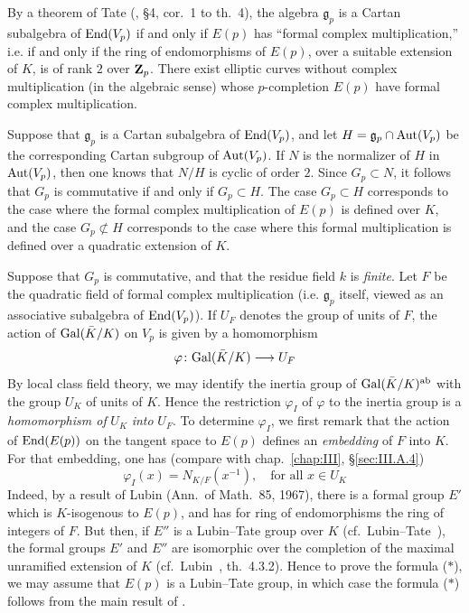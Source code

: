 \begin{remarks}
\begin{nlist}
\item By a theorem of Tate (\cite{tate-pdiv}, \S4, cor.~1 to th.~4), the
algebra $\mathfrak{g}_p$ is a Cartan subalgebra of $\mathrm{End}(V_p)$ if and
only if $E(p)$ has ``formal complex multiplication,'' i.e. if and only
if the ring of endomorphisms of $E(p)$, over a suitable extension of
$K$, is of rank $2$ over $\mathbf{Z}_p$. There exist elliptic curves without
complex multiplication (in the algebraic sense) whose $p$-completion
$E(p)$ have formal complex multiplication.
\item Suppose that $\mathfrak{g}_p$ is a Cartan subalgebra of
$\mathrm{End}(V_p)$, and let $H=\mathfrak{g}_p\cap\mathrm{Aut}(V_p)$ be the
corresponding Cartan subgroup of $\mathrm{Aut}(V_p)$. If $N$ is the normalizer
of $H$ in $\mathrm{Aut}(V_p)$, then one knows that $N/H$ is cyclic of order
$2$. Since $G_p\subset N$, it follows that $G_p$ is commutative if and
only if $G_p\subset H$. The case $G_p\subset H$ corresponds to the case
where the formal complex multiplication of $E(p)$ is defined over $K$,
and the case $G_p\not\subset H$ corresponds to the case where this
formal multiplication is defined over a quadratic extension of $K$.
\item Suppose that $G_p$ is commutative, and that the residue field $k$
is \emph{finite}. Let $F$ be the quadratic field of formal complex
multiplication (i.e. $\mathfrak{g}_p$ itself, viewed as an associative
subalgebra of $\mathrm{End}(V_p)$). If $U_F$ denotes the group of units of $F$,
the action of $\mathrm{Gal}(\bar K/K)$ on $V_p$ is given by a homomorphism
\[
\varphi\colon \mathrm{Gal}(\bar K/K) \longrightarrow U_F
\]
By local class field theory, we may identify the inertia group of
$\mathrm{Gal}(\bar K/K)^{\mathrm{ab}}$ with the group $U_K$ of units of $K$.
Hence the restriction $\varphi_I$ of $\varphi$ to the inertia group is a
\emph{homomorphism of} $U_K$ \emph{into} $U_F$. To determine
$\varphi_I$, we first remark that the action of $\mathrm{End}(E(p))$ on the
tangent space to $E(p)$ defines an \emph{embedding} of $F$ into $K$. For
that embedding, one has (compare with chap.~\ref{chap:III},
\S\ref{sec:III.A.4})
\[
\varphi_I(x) = N_{K/F}(x^{-1}), \quad\text{for all } x\in U_K
\]
Indeed, by a result of Lubin (Ann.~of Math.~85, 1967), there is a formal
group $E'$ which is $K$-isogenous to $E(p)$, and has for ring of
endomorphisms the ring of integers of $F$. But then, if $E''$ is a
Lubin--Tate group over $K$ (cf.~Lubin--Tate~\cite{lubin-tate}), the
formal groups $E'$ and $E''$ are isomorphic over the completion of the
maximal unramified extension of $K$ (cf.~Lubin~\cite{lubin},
th.~4.3.2). Hence to prove the formula ($*$), we may assume that $E(p)$
is a Lubin--Tate group, in which case the formula ($*$) follows from the
main result of \cite{lubin-tate}.
\end{nlist}
\end{remarks}


